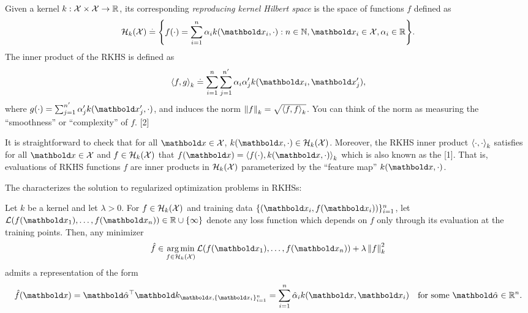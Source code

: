 \begin{defn}
  Given a kernel $k : \mathcal{X} \times \mathcal{X} \to \mathbb{R}$, its corresponding \emph{reproducing kernel Hilbert space} is the space of functions $f$ defined as \begin{align}
    \spH_k(\spX) \defeq \braces*{f(\cdot) = \sum_{i=1}^n \alpha_i k(\vx_i, \cdot) : n \in \Nat, \vx_i \in \spX, \alpha_i \in \R}.
  \end{align}
  The inner product of the RKHS is defined as \begin{align}
    \ip{f,g}_k \defeq \sum_{i=1}^n \sum_{j=1}^{n'} \alpha_i \alpha_j' k(\vx_i,\vx_j'),
  \end{align} where $g(\cdot) = \sum_{j=1}^{n'} \alpha_j' k(\vx_j',\cdot)$, and induces the norm ${\norm{f}_k = \sqrt{\ip{f,f}_k}}$.
  You can think of the norm as measuring the ``smoothness'' or ``complexity'' of $f$. [2]
\end{defn}
It is straightforward to check that for all $\vx \in \spX$, $k(\vx, \cdot) \in \spH_k(\spX)$.
Moreover, the RKHS inner product $\left\langle \cdot,\cdot \right\rangle_k$ satisfies for all $\vx \in \spX$ and $f \in \mathcal{H}_k(\mathcal{X})$ that $f(\vx) = \ip{f(\cdot), k(\vx, \cdot)}_k$ which is also known as the  [1].
That is, evaluations of RKHS functions $f$ are inner products in $\mathcal{H}_k(\mathcal{X})$ parameterized by the ``feature map'' $k(\vx,\cdot)$.

The  \citep{scholkopf2001generalized} characterizes the solution to regularized optimization problems in RKHSs:

\begin{thm}
  Let $k$ be a kernel and let $\lambda > 0$.
  For $f \in \mathcal{H}_k(\mathcal{X})$ and training data $\{(\vx_i, f(\vx_i))\}_{i=1}^n$, let ${\spL(f(\vx_1), \dots, f(\vx_n))} \in {\R \cup \{\infty\}}$ denote any loss function which depends on $f$ only through its evaluation at the training points.
  Then, any minimizer \begin{align}
    \hat{f} \in \argmin_{f \in \spH_k(\spX)} \spL(f(\vx_1), \dots, f(\vx_n)) + \lambda \norm{f}_k^2 \label{eq:representer_theorem_obj}
  \end{align} admits a representation of the form \begin{align}
    \hat{f}(\vx) = \transpose{\valphahat} \vk_{\vx,\{\vx_i\}_{i=1}^n} = \sum_{i=1}^n \hat{\alpha}_i k(\vx, \vx_i) \quad\text{for some $\valphahat \in \R^n$}. \label{eq:representer_theorem}
  \end{align}
\end{thm}

